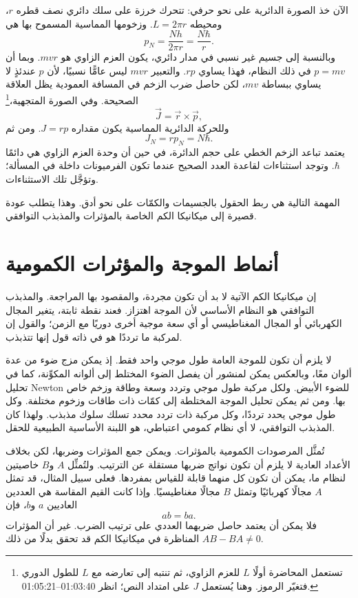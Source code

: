 الآن خذ الصورة الدائرية على نحو حرفي: تتحرك خرزة على سلك دائري نصف قطره \(r\)، ومحيطه \(L=2\pi r\). وزخومها المماسية المسموح بها هي
\begin{equation}
p_N=\frac{Nh}{2\pi r}=\frac{N\hbar}{r}.
\end{equation}
وبالنسبة إلى جسيم غير نسبي في مدار دائري، يكون العزم الزاوي هو \(mvr\). وبما أن \(p=mv\) في ذلك النظام، فهذا يساوي \(rp\). والتعبير \(mvr\) ليس عامًّا نسبيًا، لأن \(p\) عندئذٍ لا يساوي ببساطة \(mv\)، لكن حاصل ضرب الزخم في المسافة العمودية يظل العلاقة الصحيحة. وفي الصورة المتجهية،\footnote{تستعمل المحاضرة أولًا \(L\) للعزم الزاوي، ثم تنتبه إلى تعارضه مع \(L\) للطول الدوري فتغيّر الرموز. وهنا يُستعمل \(J\) على امتداد النص؛ انظر 01:03:40--01:05:21.}
\begin{equation}
\vec J=\vec r\times\vec p,
\end{equation}
وللحركة الدائرية المماسية يكون مقداره \(J=rp\). ومن ثم
\begin{equation}
J_N=rp_N=N\hbar.
\end{equation}
يعتمد تباعد الزخم الخطي على حجم الدائرة، في حين أن وحدة العزم الزاوي هي دائمًا \(\hbar\). وتوجد استثناءات لقاعدة العدد الصحيح عندما تكون الفرميونات داخلة في المسألة؛ وتؤجَّل تلك الاستثناءات.

المهمة التالية هي ربط الحقول بالجسيمات والكمّات على نحو أدق. وهذا يتطلب عودة قصيرة إلى ميكانيكا الكم الخاصة بالمؤثرات والمذبذب التوافقي.

\section{أنماط الموجة والمؤثرات الكمومية}

إن ميكانيكا الكم الآتية لا بد أن تكون مجردة، والمقصود بها المراجعة. والمذبذب التوافقي هو النظام الأساسي لأن الموجة اهتزاز. فعند نقطة ثابتة، يتغير المجال الكهربائي أو المجال المغناطيسي أو أي سعة موجية أخرى دوريًا مع الزمن؛ والقول إن لمركبة ما ترددًا هو في ذاته قول إنها تتذبذب.

لا يلزم أن تكون للموجة العامة طول موجي واحد فقط. إذ يمكن مزج ضوء من عدة ألوان معًا، وبالعكس يمكن لمنشور أن يفصل الضوء المختلط إلى ألوانه المكوِّنة، كما في تحليل Newton للضوء الأبيض. ولكل مركبة طول موجي وتردد وسعة وطاقة وزخم خاص بها. ومن ثم يمكن تحليل الموجة المختلطة إلى كمّات ذات طاقات وزخوم مختلفة. وكل طول موجي يحدد ترددًا، وكل مركبة ذات تردد محدد تسلك سلوك مذبذب. ولهذا كان المذبذب التوافقي، لا أي نظام كمومي اعتباطي، هو اللبنة الأساسية الطبيعية للحقل.

تُمثَّل المرصودات الكمومية بالمؤثرات. ويمكن جمع المؤثرات وضربها، لكن بخلاف الأعداد العادية لا يلزم أن تكون نواتج ضربها مستقلة عن الترتيب. ولتُمثِّل \(A\) و\(B\) خاصيتين لنظام ما، يمكن أن تكون كل منهما قابلة للقياس بمفردها. فعلى سبيل المثال، قد تمثل \(A\) مجالًا كهربائيًا وتمثل \(B\) مجالًا مغناطيسيًا. وإذا كانت القيم المقاسة هي العددين العاديين \(a\) و\(b\)، فإن
\begin{equation}
ab=ba.
\end{equation}
فلا يمكن أن يعتمد حاصل ضربهما العددي على ترتيب الضرب. غير أن المؤثرات المناظرة في ميكانيكا الكم قد تحقق بدلًا من ذلك \(AB-BA\neq0\).

